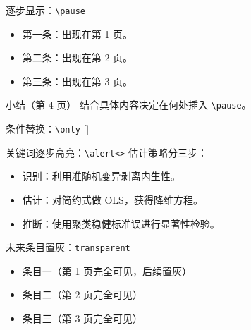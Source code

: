 \begin{frame}{逐步显示：\texttt{\textbackslash pause}}
  \begin{itemize}
    \item 第一条：出现在第 1 页。
    \pause
    \item 第二条：出现在第 2 页。
    \pause
    \item 第三条：出现在第 3 页。
  \end{itemize}
  \pause
  \begin{exampleblock}{小结（第 4 页）}
    结合具体内容决定在何处插入 \texttt{\textbackslash pause}。
  \end{exampleblock}
\end{frame}

\begin{frame}{条件替换：\texttt{\textbackslash only}}
  \vspace{0.5cm}
  \centering\footnotesize
  []
\end{frame}

\begin{frame}{关键词逐步高亮：\texttt{\textbackslash alert<>}}
  估计策略分三步：
  \begin{itemize}
    \item<1-> \alert<1>{识别}：利用准随机变异剥离内生性。
    \item<2-> \alert<2>{估计}：对简约式做 OLS，获得降维方程。
    \item<3-> \alert<3>{推断}：使用聚类稳健标准误进行显著性检验。
  \end{itemize}
\end{frame}

\begin{frame}{未来条目置灰：\texttt{transparent}}
  {%
    \begin{itemize}
      \item<1-> 条目一（第 1 页完全可见，后续置灰）
      \item<2-> 条目二（第 2 页完全可见）
      \item<3-> 条目三（第 3 页完全可见）
    \end{itemize}
  }
\end{frame}

